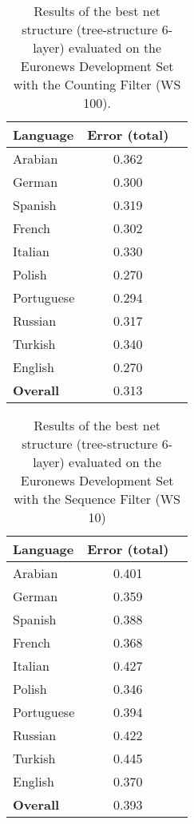 \begin{table}[!htbp]
\centering
\caption{Results of the best net structure (tree-structure 6-layer) evaluated on the Euronews Development Set with the Counting Filter (WS 100).}
\label{tab:gauss}
\begin{tabular}{| l | c | r | }
	\hline
	\textbf{Language} & \textbf{Error (total) }  \\
	\hline
	Arabian & 0.362  \\
	German & 0.300  \\
	Spanish & 0.319 \\ 
	French & 0.302 \\
	Italian & 0.330  \\
	Polish & 0.270 \\
	Portuguese& 0.294 \\
	Russian&  0.317 \\
	Turkish&  0.340 \\
	English&  0.270 \\
	\hline
	\textbf{Overall} & 0.313 \\
	\hline
\end{tabular}
\end{table}

\begin{table}[!htbp]
\centering
\caption{Results of the best net structure (tree-structure 6-layer) evaluated on the Euronews Development Set with the Sequence Filter (WS 10)}
\label{tab:sequence}
\begin{tabular}{| l | c | r | }
	\hline
	\textbf{Language} & \textbf{Error (total) }  \\
	\hline
	Arabian & 0.401  \\
	German & 0.359  \\
	Spanish & 0.388 \\ 
	French & 0.368 \\
	Italian & 0.427  \\
	Polish & 0.346 \\
	Portuguese& 0.394 \\
	Russian&  0.422 \\
	Turkish&  0.445 \\
	English&  0.370 \\
	\hline
	\textbf{Overall} & 0.393 \\
	\hline
\end{tabular}
\end{table}

